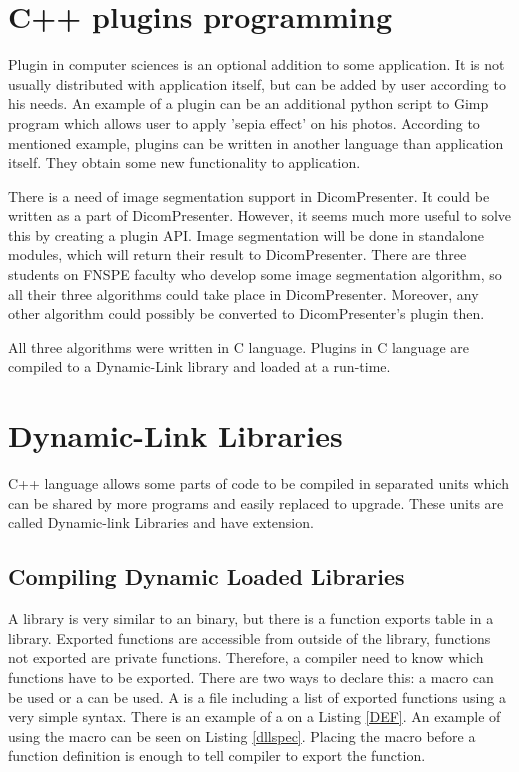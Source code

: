 \section*{C++ plugins programming}

Plugin in computer sciences is an optional addition to some application. It is not usually distributed with application itself, but can be added by user according to his needs. An example of a plugin can be an additional python script to Gimp program which allows user to apply 'sepia effect' on his photos. According to mentioned example, plugins can be written in another language than application itself. They obtain some new functionality to application.

There is a need of image segmentation support in DicomPresenter. It could be written as a part of DicomPresenter. However, it seems much more useful to solve this by creating a plugin API. Image segmentation will be done in standalone modules, which will return their result to DicomPresenter. There are three students on FNSPE faculty who develop some image segmentation algorithm, so all their three algorithms could take place in DicomPresenter. Moreover, any other algorithm could possibly be converted to DicomPresenter's plugin then.

All three algorithms were written in C language. Plugins in C language are compiled to a Dynamic-Link library and loaded at a run-time.

\section*{Dynamic-Link Libraries}

C++ language allows some parts of code to be compiled in separated units which can be shared by more programs and easily replaced to upgrade. These units are called Dynamic-link Libraries and have  extension.

\subsection*{Compiling Dynamic Loaded Libraries}

A  library is very similar to an  binary, but there is a function exports table in a  library. Exported functions are accessible from outside of the library, functions not exported are private functions. Therefore, a compiler need to know which functions have to be exported. There are two ways to declare this: a  macro can be used or a  can be used. A  is a file including a list of exported functions using a very simple syntax. There is an example of a  on a Listing \ref{DEF}. An example of using the  macro can be seen on Listing \ref{dllspec}. Placing the macro before a function definition is enough to tell compiler to export the function.

